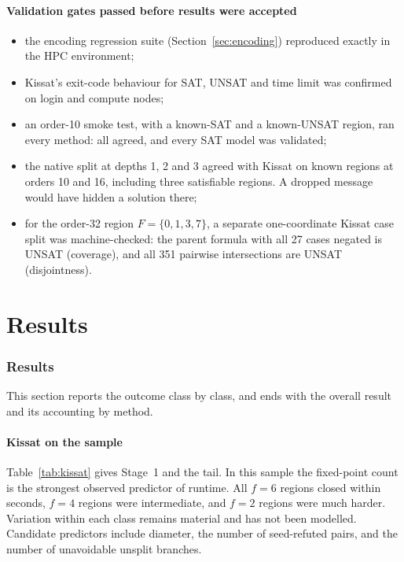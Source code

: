 \documentclass[11pt,a4paper]{article}
\theoremstyle{definition}
\begin{document}
\subsection{Validation gates passed before results were accepted}
\begin{itemize}
\item the encoding regression suite (Section~\ref{sec:encoding}) reproduced exactly in the HPC environment;
\item Kissat's exit-code behaviour for SAT, UNSAT and time limit was confirmed on login and
compute nodes;
\item an order-10 smoke test, with a known-SAT and a known-UNSAT region, ran every method: all
agreed, and every SAT model was validated;
\item the native split at depths 1, 2 and 3 agreed with Kissat on known regions at orders 10
and 16, including three satisfiable regions. A dropped message would have hidden a solution
there;
\item for the order-32 region $F=\{0,1,3,7\}$, a separate one-coordinate Kissat case split was
machine-checked: the parent formula with all 27 cases negated is UNSAT (coverage), and all
351 pairwise intersections are UNSAT (disjointness).
\end{itemize}



\part{Results}

\section{Results}\label{sec:results}
This section reports the outcome class by class, and ends with the overall result and its accounting by method.


\subsection{Kissat on the sample}

Table~\ref{tab:kissat} gives Stage~1 and the tail. In this sample the fixed-point count is the
strongest observed predictor of runtime. All $f=6$ regions closed within seconds, $f=4$
regions were intermediate, and $f=2$ regions were much harder. Variation within each class
remains material and has not been modelled. Candidate predictors include diameter, the number
of seed-refuted pairs, and the number of unavoidable unsplit branches.
\end{document}
